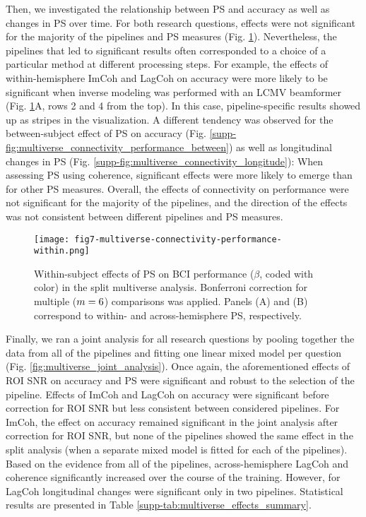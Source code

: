 \medskip

Then, we investigated the relationship between PS and accuracy as well as changes in PS over time. For both research questions, effects were not significant for the majority of the pipelines and PS measures (Fig. \ref{fig:multiverse_connectivity_performance_within}). Nevertheless, the pipelines that led to significant results often corresponded to a choice of a particular method at different processing steps. For example, the effects of within-hemisphere ImCoh and LagCoh on accuracy were more likely to be significant when inverse modeling was performed with an LCMV beamformer (Fig. \ref{fig:multiverse_connectivity_performance_within}A, rows 2 and 4 from the top). In this case, pipeline-specific results showed up as stripes in the visualization. A different tendency was observed for the between-subject effect of PS on accuracy (Fig. \ref{supp-fig:multiverse_connectivity_performance_between}) as well as longitudinal changes in PS (Fig. \ref{supp-fig:multiverse_connectivity_longitude}): When assessing PS using coherence, significant effects were more likely to emerge than for other PS measures. Overall, the effects of connectivity on performance were not significant for the majority of the pipelines, and the direction of the effects was not consistent between different pipelines and PS measures.

\begin{figure}[htbp]
    \centering
    \texttt{[image: fig7-multiverse-connectivity-performance-within.png]}
    \caption{Within-subject effects of PS on BCI performance ($\beta$, coded with color) in the split multiverse analysis. Bonferroni correction for multiple ($m = 6$) comparisons was applied. Panels (A) and (B) correspond to within- and across-hemisphere PS, respectively.}
    \label{fig:multiverse_connectivity_performance_within}
\end{figure}

\medskip

Finally, we ran a joint analysis for all research questions by pooling together the data from all of the pipelines and fitting one linear mixed model per question (Fig. \ref{fig:multiverse_joint_analysis}). Once again, the aforementioned effects of ROI SNR on accuracy and PS were significant and robust to the selection of the pipeline. Effects of ImCoh and LagCoh on accuracy were significant before correction for ROI SNR but less consistent between considered pipelines. For ImCoh, the effect on accuracy remained significant in the joint analysis after correction for ROI SNR, but none of the pipelines showed the same effect in the split analysis (when a separate mixed model is fitted for each of the pipelines). Based on the evidence from all of the pipelines, across-hemisphere LagCoh and coherence significantly increased over the course of the training. However, for LagCoh longitudinal changes were significant only in two pipelines. Statistical results are presented in Table \ref{supp-tab:multiverse_effects_summary}. 

